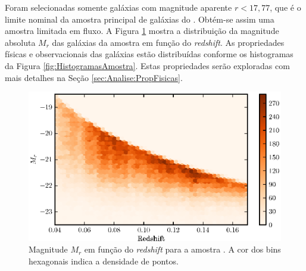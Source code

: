 Foram selecionadas somente galáxias com magnitude aparente $r<17,77$, que é o
limite nominal da amostra principal de galáxias do \SDSS \citep[; ][]{Strauss2002}. Obtém-se assim uma amostra limitada em fluxo.
A Figura \ref{fig:CompletezaRedshiftMag} mostra a distribuição da magnitude
absoluta $M_r$ das galáxias da amostra em função do {\em redshift}. As
propriedades físicas e observacionais das galáxias estão distribuídas conforme
os histogramas da Figura \ref{fig:HistogramasAmostra}. Estas propriedades serão
exploradas com mais detalhes na Seção \ref{sec:Analise:PropFisicas}.

\begin{figure}
	\includegraphics{figuras/completeness-volume.eps}
	\caption[Magnitude $M_r$ em função do {\em redshift}.]
	{Magnitude $M_r$ em função do {\em redshift} para a amostra \starlightUV. A
	cor dos bins hexagonais indica a densidade de pontos.}
	\label{fig:CompletezaRedshiftMag}
\end{figure}

